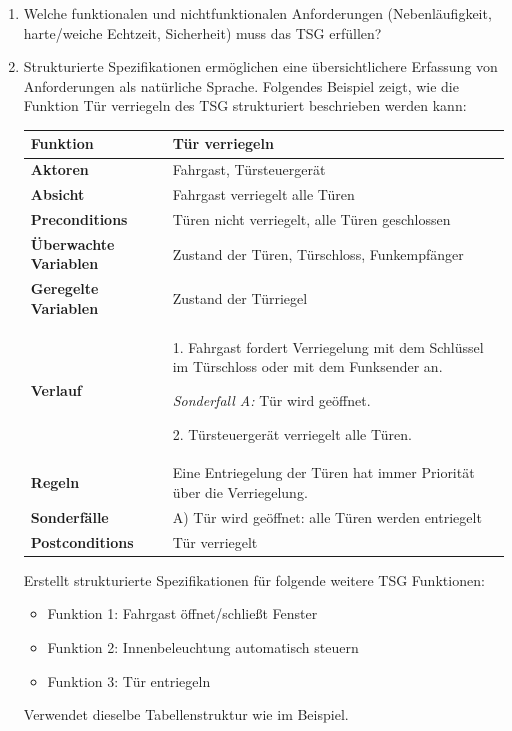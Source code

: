 \begin{enumerate}
    \item Welche funktionalen und nichtfunktionalen Anforderungen (Nebenläufigkeit, harte/weiche Echtzeit, Sicherheit) muss das TSG erfüllen?
    \item Strukturierte Spezifikationen ermöglichen eine übersichtlichere Erfassung von Anforderungen als natürliche
Sprache. Folgendes Beispiel zeigt, wie die Funktion Tür verriegeln des TSG strukturiert beschrieben
werden kann:
    \begin{table}[h]
\centering
\renewcommand{\arraystretch}{1.2}
\begin{tabular}{|p{4cm}|p{11cm}|}
\hline
\textbf{Funktion} & \textbf{Tür verriegeln} \\ \hline
\textbf{Aktoren} & Fahrgast, Türsteuergerät \\ \hline
\textbf{Absicht} & Fahrgast verriegelt alle Türen \\ \hline
\textbf{Preconditions} & Türen nicht verriegelt, alle Türen geschlossen \\ \hline
\textbf{Überwachte Variablen} & Zustand der Türen, Türschloss, Funkempfänger \\ \hline
\textbf{Geregelte Variablen} & Zustand der Türriegel \\ \hline
\textbf{Verlauf} &
1. Fahrgast fordert Verriegelung mit dem Schlüssel im Türschloss oder mit dem Funksender an.

\emph{Sonderfall A:} Tür wird geöffnet.

2. Türsteuergerät verriegelt alle Türen.
\\ \hline
\textbf{Regeln} &
Eine Entriegelung der Türen hat immer Priorität über die Verriegelung.
\\ \hline
\textbf{Sonderfälle} &
A) Tür wird geöffnet: alle Türen werden entriegelt
\\ \hline
\textbf{Postconditions} & Tür verriegelt \\ \hline
\end{tabular}
\end{table}
Erstellt strukturierte Spezifikationen für folgende weitere TSG Funktionen:
\begin{itemize}
\item Funktion 1: Fahrgast öffnet/schließt Fenster
\item Funktion 2: Innenbeleuchtung automatisch steuern
\item Funktion 3: Tür entriegeln
\end{itemize}
Verwendet dieselbe Tabellenstruktur wie im Beispiel.
\end{enumerate}

